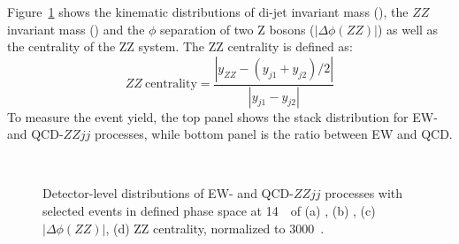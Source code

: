 Figure~\ref{fig:kine} shows the kinematic distributions of di-jet invariant mass (\mjj), the $ZZ$ invariant mass (\mzz) and 
the $\phi$ separation of two Z bosons ($|\Delta\phi(ZZ)|$) as well as the centrality of the ZZ system.
The ZZ centrality is defined as:
\begin{equation}
  ZZ~\text{centrality} = \frac{|y_{ZZ} - (y_{j1} + y_{j2})/2|}{|y_{j1} - y_{j2}|}
\end{equation}
To measure the event yield, the top panel shows the stack distribution for EW- and QCD-$ZZjj$ processes,
while bottom panel is the ratio between EW and QCD.
\begin{figure}[!htbp]
\centering
{}
\\
\caption{
Detector-level distributions of EW- and QCD-$ZZjj$ processes with selected events in defined phase space at 14~\tev~of 
(a) \mjj,
(b) \mzz,
(c) $|\Delta\phi(ZZ)|$,
(d) ZZ centrality,
normalized to 3000~\ifb{}.
}
\label{fig:kine}
\end{figure}


